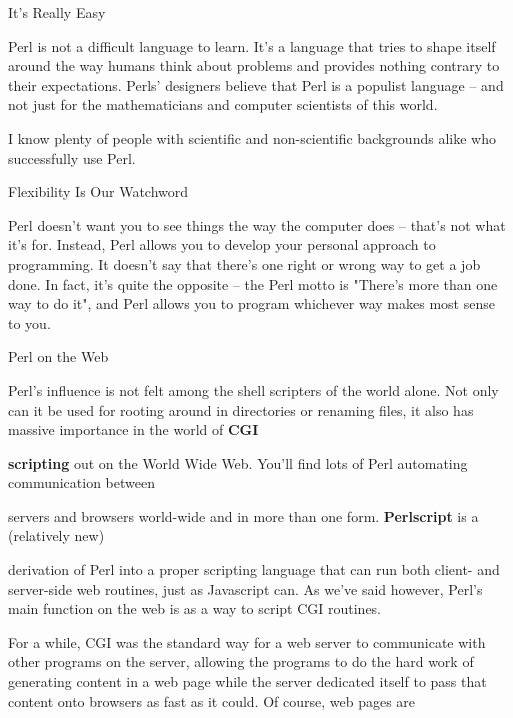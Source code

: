 \documentclass[a4paper,11pt]{book}
\begin{document}
\noindent 

\noindent It's Really Easy

\noindent Perl is not a difficult language to learn. It's a language that tries to shape itself around the way humans think about problems and provides nothing contrary to their expectations. Perls' designers believe that Perl is a populist language -- and not just for the mathematicians and computer scientists of this world.

\noindent I know plenty of people with scientific and non-scientific backgrounds alike who successfully use Perl.

\noindent 

\noindent Flexibility Is Our Watchword

\noindent Perl doesn't want you to see things the way the computer does -- that's not what it's for. Instead, Perl allows you to develop your personal approach to programming. It doesn't say that there's one right or wrong way to get a job done. In fact, it's quite the opposite -- the Perl motto is "There's more than one way to do it", and Perl allows you to program whichever way makes most sense to you.

\noindent 

\noindent Perl on the Web

\noindent Perl's influence is not felt among the shell scripters of the world alone. Not only can it be used for rooting around in directories or renaming files, it also has massive importance in the world of \textbf{CGI}

\noindent 

\noindent 

\noindent \textbf{scripting }out on the World Wide  Web.  You'll  find  lots  of  Perl  automating  communication  between

\noindent servers and browsers world-wide  and  in  more  than  one  form.  \textbf{Perlscript  }is  a  (relatively  new)

\noindent derivation of Perl into  a  proper  scripting  language  that  can  run  both  client-  and server-side  web routines,  just as Javascript can.  As  we've  said  however,  Perl's  main  function  on  the web  is  as  a  way to script CGI routines.

\noindent 

\noindent For a while, CGI was the standard way for a web server to communicate with other programs on the server, allowing the programs to do the hard work of generating content in a web page while the server dedicated itself to pass that content onto browsers as fast as it could. Of course, web pages are
\end{document}
